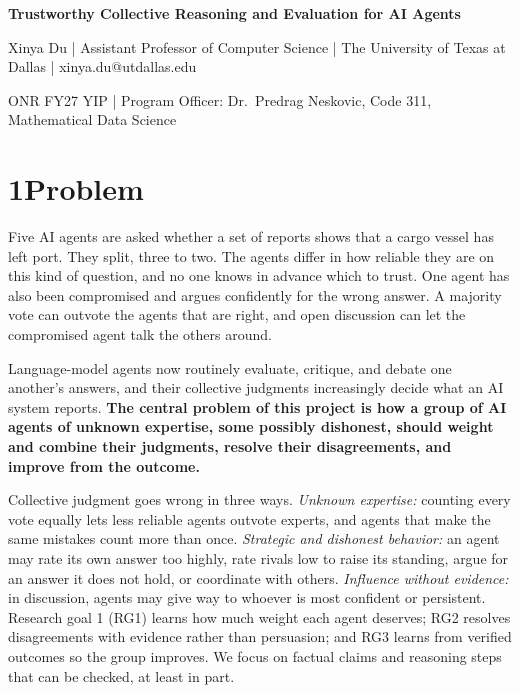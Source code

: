 \documentclass[11pt,letterpaper]{article}
\begin{document}
\begin{center}
{\fontsize{14}{16}\selectfont\bfseries Trustworthy Collective Reasoning and Evaluation for AI Agents\par}
\vspace{2pt}
{\small Xinya Du | Assistant Professor of Computer Science | The University of Texas at Dallas | xinya.du@utdallas.edu\par}
{\small ONR FY27 YIP | Program Officer: Dr.\ Predrag Neskovic, Code 311, Mathematical Data Science\par}
\end{center}

\section*{1\quad Problem}
Five AI agents are asked whether a set of reports shows that a cargo vessel has left port. They split, three to two. The agents differ in how reliable they are on this kind of question, and no one knows in advance which to trust. One agent has also been compromised and argues confidently for the wrong answer. A majority vote can outvote the agents that are right, and open discussion can let the compromised agent talk the others around.

Language-model agents now routinely evaluate, critique, and debate one another's answers, and their collective judgments increasingly decide what an AI system reports. \textbf{The central problem of this project is how a group of AI agents of unknown expertise, some possibly dishonest, should weight and combine their judgments, resolve their disagreements, and improve from the outcome.}

Collective judgment goes wrong in three ways. \emph{Unknown expertise:} counting every vote equally lets less reliable agents outvote experts, and agents that make the same mistakes count more than once. \emph{Strategic and dishonest behavior:} an agent may rate its own answer too highly, rate rivals low to raise its standing, argue for an answer it does not hold, or coordinate with others. \emph{Influence without evidence:} in discussion, agents may give way to whoever is most confident or persistent. Research goal 1 (RG1) learns how much weight each agent deserves; RG2 resolves disagreements with evidence rather than persuasion; and RG3 learns from verified outcomes so the group improves. We focus on factual claims and reasoning steps that can be checked, at least in part.
\end{document}
